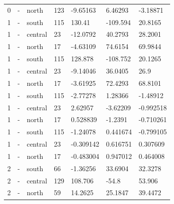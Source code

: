 \begin{longtable}
{}0 & \allowbreak{}-\allowbreak{} & north & 123 & -9.65163 & 6.46293 & -3.18871 \\
{}1 & \allowbreak{}-\allowbreak{} & south & 115 & 130.41 & -109.594 & 20.8165 \\
{}1 & \allowbreak{}-\allowbreak{} & central & 23 & -12.0792 & 40.2793 & 28.2001 \\
{}1 & \allowbreak{}-\allowbreak{} & north & 17 & -4.63109 & 74.6154 & 69.9844 \\
{}1 & \allowbreak{}-\allowbreak{} & south & 115 & 128.878 & -108.752 & 20.1265 \\
{}1 & \allowbreak{}-\allowbreak{} & central & 23 & -9.14046 & 36.0405 & 26.9 \\
{}1 & \allowbreak{}-\allowbreak{} & north & 17 & -3.61925 & 72.4293 & 68.8101 \\
{}1 & \allowbreak{}-\allowbreak{} & south & 115 & -2.77278 & 1.28366 & -1.48912 \\
{}1 & \allowbreak{}-\allowbreak{} & central & 23 & 2.62957 & -3.62209 & -0.992518 \\
{}1 & \allowbreak{}-\allowbreak{} & north & 17 & 0.528839 & -1.2391 & -0.710261 \\
{}1 & \allowbreak{}-\allowbreak{} & south & 115 & -1.24078 & 0.441674 & -0.799105 \\
{}1 & \allowbreak{}-\allowbreak{} & central & 23 & -0.309142 & 0.616751 & 0.307609 \\
{}1 & \allowbreak{}-\allowbreak{} & north & 17 & -0.483004 & 0.947012 & 0.464008 \\
{}2 & \allowbreak{}-\allowbreak{} & south & 66 & -1.36256 & 33.6904 & 32.3278 \\
{}2 & \allowbreak{}-\allowbreak{} & central & 129 & 108.706 & -54.8 & 53.906 \\
{}2 & \allowbreak{}-\allowbreak{} & north & 59 & 14.2625 & 25.1847 & 39.4472 \\

\end{longtable}
